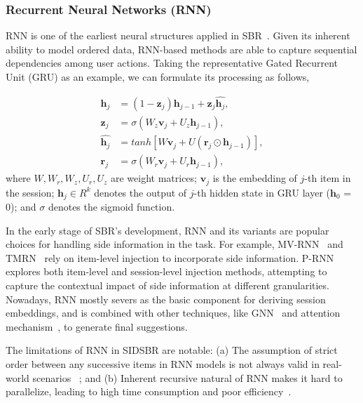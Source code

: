 \documentclass[lettersize,journal]{IEEEtran}
\newcommand{\baby}{{SIDSBR}\xspace}
\begin{document}
\subsubsection{Recurrent Neural Networks (RNN)}
RNN is one of the earliest neural structures applied in SBR~\cite{GRU4Rec}. Given its inherent ability to model ordered data, RNN-based methods are able to capture sequential dependencies among user actions. Taking the representative Gated Recurrent Unit (GRU) as an example, we can formulate its processing as follows,

\begin{equation}
    \begin{split}
         \textbf{h}_j &= ( 1 - \textbf{z}_j) \textbf{h}_{j-1} + \textbf{z}_j \hat{\textbf{h}_j}, \\
         \textbf{z}_j &= \sigma ( W_z \textbf{v}_j + U_z \textbf{h}_{j-1} ), \\
        \hat{\textbf{h}_j}  &= tanh[ W \textbf{v}_j + U ( \textbf{r}_j \odot \textbf{h}_{j-1} )], \\
        \textbf{r}_j &= \sigma ( W_r \textbf{v}_j + U_r \textbf{h}_{j-1} ),
    \end{split}
\end{equation}
where $ W, W_r, W_z, U_r, U_z $ are weight matrices; $ \textbf{v}_j $ is the embedding of $j$-th item in the session; $ \textbf{h}_j \in R^k $ denotes the output of $j$-th hidden state in GRU layer ($ \textbf{h}_0 $ = 0); and $ \sigma $ denotes the sigmoid function.



In the early stage of SBR's development, RNN and its variants are popular choices for handling side information in the task. For example, MV-RNN~\cite{MV-RNN} and TMRN~\cite{Huang@WSDM2019} rely on item-level injection to incorporate side information. P-RNN~\cite{P-RNN} explores both item-level and session-level injection methods, attempting to capture the contextual impact of side information at different granularities. 
Nowadays, RNN mostly severs as the basic component for deriving session embeddings, and is combined with other techniques, like GNN~\cite{FGNN,Yuan@ICDE2022} and attention mechanism~\cite{liu@WWW2020}, to generate final suggestions.

The limitations of RNN in \baby are notable: (a) The assumption of strict order between any successive items in RNN models is not always valid in real-world scenarios ~\cite{Wang@IJCAI2019, MCPRN}; and (b) Inherent recursive natural of RNN makes it hard to parallelize, leading to high time consumption and poor efficiency~\cite{STAMP,DIDN,BERT4Rec}.
\end{document}
